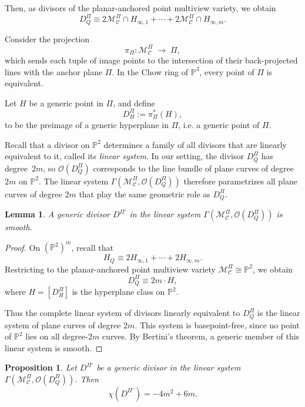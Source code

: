 \documentclass{article}
\newtheorem{proposition}{Proposition}
\newtheorem{lemma}{Lemma}
\newcommand{\PP}{\mathbb{P}}
\begin{document}
Then, as divisors of the planar-anchored point multiview variety, we obtain
\[
D_Q^{\Pi} \equiv 2\mathcal{M}_\mathcal{C}^{\Pi} \cap H_{\infty,1} 
+ \cdots + 2\mathcal{M}_\mathcal{C}^{\Pi} \cap H_{\infty,m}.
\]

Consider the projection 
\[
\pi_{\Pi} : \mathcal{M}_\mathcal{C}^{\Pi} \;\longrightarrow\; \Pi,
\]
which sends each tuple of image points to the intersection of their back-projected lines with the anchor plane $\Pi$.  
In the Chow ring of $\mathbb{P}^3$, every point of $\Pi$ is equivalent.  

Let $H$ be a generic point in $\Pi$, and define
\[
D_H^{\Pi} := \pi_{\Pi}^*(H),
\]  
to be the preimage of a generic hyperplane in $\Pi$, i.e. a generic
point of $\Pi.$ 

Recall that a divisor on $\PP^2$ determines a family of all
divisors that are linearly equivalent to it, called its \emph{linear system}.  In our setting,
the divisor $D_Q^\Pi$ has degree~$2m$, so $\mathcal{O}(D_Q^\Pi)$ corresponds to the
line bundle of plane curves of degree~$2m$ on $\PP^2$.  The linear system
$\Gamma(\mathcal{M}^\Pi_{\mathcal C},\mathcal{O}(D_Q^\Pi))$ therefore parametrizes all
plane curves of degree $2m$ that play the same geometric role as $D_Q^\Pi$.

\begin{lemma}
A generic divisor $D^{\Pi'}$ in the linear system 
$\Gamma(\mathcal{M}^\Pi_{\mathcal C}, \mathcal{O}(D_Q^\Pi))$ is smooth.
\end{lemma}

\begin{proof}
On $(\PP^2)^m$, recall that 
\[
H_Q \equiv 2H_{\infty,1} + \cdots + 2H_{\infty,m}.
\]
Restricting to the planar-anchored point multiview variety 
$\mathcal{M}^\Pi_{\mathcal C}\cong \PP^2$, we obtain
\[
D_Q^\Pi \equiv 2m \cdot H,
\]
where $H=[D_H^\Pi]$ is the hyperplane class on $\PP^2$.

Thus the complete linear system of divisors linearly equivalent to $D_Q^\Pi$
is the linear system of plane curves of degree $2m$.
This system is basepoint-free, since no point of $\PP^2$ lies on all 
degree-$2m$ curves.
By Bertini’s theorem, a generic member of this linear system is smooth.
\end{proof}
\begin{proposition}\label{prop: generic divisor}
Let $D^{\Pi'}$ be a generic divisor in the linear system 
$\Gamma(\mathcal{M}^\Pi_{\mathcal C}, \mathcal{O}(D_Q^\Pi))$. Then
\[
\chi(D^{\Pi'}) = -4m^2 + 6m.
\]
\end{proposition}
\end{document}
